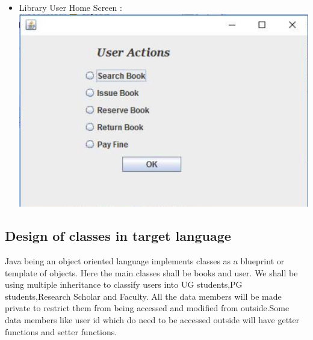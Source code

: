 \documentclass[a4paper]{article}
\begin{document}
\begin{itemize}
\item Library User Home Screen : \\
\includegraphics[scale=0.5]{images/user.png}
\end{itemize}

\subsection{Design of classes in target language}
Java being an object oriented language implements classes  as a blueprint or template of objects. Here the main classes shall be books and user.
We shall be using multiple inheritance to classify users into UG students,PG students,Research Scholar and Faculty.
All the data members will be made private to restrict them from being accessed and modified from outside.Some data members like user id which do need to be accessed outside will have getter functions and setter functions. 
\end{document}
